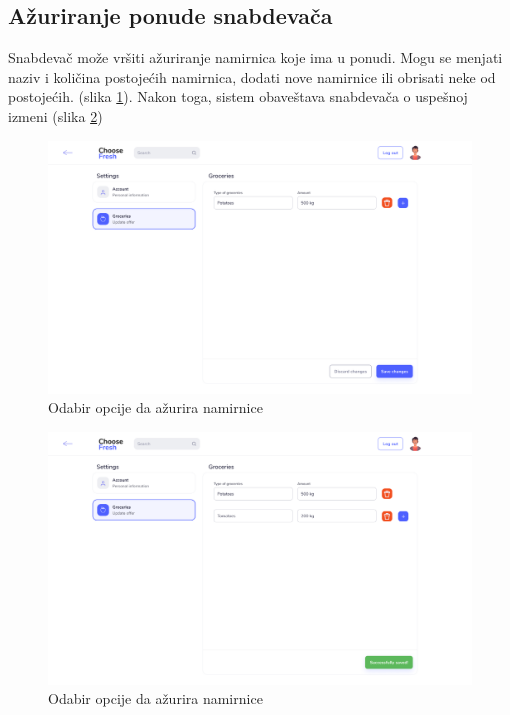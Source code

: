 \subsection{Ažuriranje ponude snabdevača}

Snabdevač može vršiti ažuriranje namirnica koje ima u ponudi. Mogu se menjati naziv i količina postojećih namirnica, dodati nove namirnice ili obrisati neke od postojećih. (slika \ref{fig:SupplierGroceriesUpdateScreen1}). Nakon toga, sistem obaveštava snabdevača o uspešnoj izmeni (slika \ref{fig:SupplierGroceriesUpdateScreen2})

\begin{figure}[H]
	\begin{center}
		\includegraphics[width=\textwidth]{UI/Supplier Groceries Update (Screen 1).png}
    		\caption{Odabir opcije da ažurira namirnice}
    \label{fig:SupplierGroceriesUpdateScreen1}
    \end{center}
\end{figure}

\begin{figure}[H]
	\begin{center}
		\includegraphics[width=\textwidth]{UI/Supplier Groceries Update (Screen 2).png}
    		\caption{Odabir opcije da ažurira namirnice}
    \label{fig:SupplierGroceriesUpdateScreen2}
    \end{center}
\end{figure}
